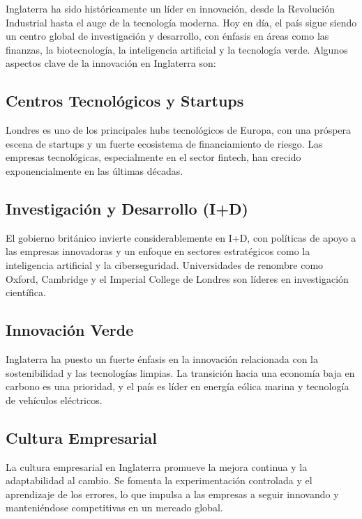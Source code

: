 \documentclass[letterpaper, 12pt]{article}
\begin{document}
Inglaterra ha sido históricamente un líder en innovación, desde la Revolución
Industrial hasta el auge de la tecnología moderna. Hoy en día, el país sigue
siendo un centro global de investigación y desarrollo, con énfasis en áreas
como las finanzas, la biotecnología, la inteligencia artificial y la tecnología
verde. Algunos aspectos clave de la innovación en Inglaterra son:

\subsection*{Centros Tecnológicos y Startups}

Londres es uno de los principales hubs tecnológicos de Europa, con una próspera
escena de startups y un fuerte ecosistema de financiamiento de riesgo. Las
empresas tecnológicas, especialmente en el sector fintech, han crecido
exponencialmente en las últimas décadas.

\subsection*{Investigación y Desarrollo (I+D)}

El gobierno británico invierte considerablemente en I+D, con políticas de apoyo
a las empresas innovadoras y un enfoque en sectores estratégicos como la
inteligencia artificial y la ciberseguridad. Universidades de renombre como
Oxford, Cambridge y el Imperial College de Londres son líderes en investigación
científica.

\subsection*{Innovación Verde}

Inglaterra ha puesto un fuerte énfasis en la innovación relacionada con la
sostenibilidad y las tecnologías limpias. La transición hacia una economía baja
en carbono es una prioridad, y el país es líder en energía eólica marina y
tecnología de vehículos eléctricos.

\subsection*{Cultura Empresarial}

La cultura empresarial en Inglaterra promueve la mejora continua y la
adaptabilidad al cambio. Se fomenta la experimentación controlada y el
aprendizaje de los errores, lo que impulsa a las empresas a seguir innovando y
manteniéndose competitivas en un mercado global.
\end{document}
